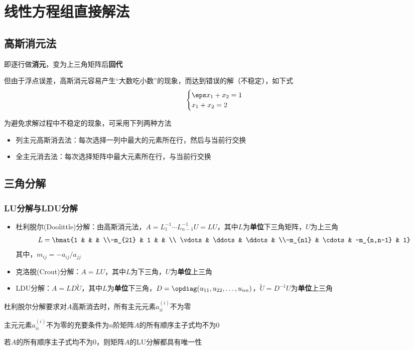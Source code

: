 
\section{线性方程组直接解法}
\subsection{高斯消元法}
即逐行做\textbf{消元}，变为上三角矩阵后\textbf{回代}

但由于浮点误差，高斯消元容易产生``大数吃小数''的现象，而达到错误的解（不稳定），如下式
\[\begin{cases}
    \eps x_1+x_2=1\\
    x_1+x_2=2
\end{cases}\]

为避免求解过程中不稳定的现象，可采用下列两种方法
\begin{itemize}
    \item 列主元高斯消去法：每次选择一列中最大的元素所在行，然后与当前行交换
    \item 全主元消去法：每次选择矩阵中最大元素所在行，与当前行交换
\end{itemize}

\subsection{三角分解}
\subsubsection{LU分解与LDU分解}
\begin{itemize}
\item 杜利脱尔(Doolittle)分解：由高斯消元法，$A=L_1^{-1}\cdots L_{n-1}^{-1}U=LU$，其中$L$为\textbf{单位}下三角矩阵，$U$为上三角
\[L=\bmat{1 & & & \\-m_{21} & 1 & & \\ \vdots & \ddots & \ddots & \\-m_{n1} & \cdots & -m_{n,n-1} & 1}\]
其中，$m_{ij}=-a_{ij}/a_{jj}$
\item 克洛脱(Crout)分解：$A=LU$，其中$L$为下三角，$U$为\textbf{单位}上三角
\item LDU分解：$A=LD\tilde{U}$，其中$L$为\textbf{单位}下三角，$D=\opdiag(u_{11},u_{22},\ldots,u_{nn})$，$\tilde{U}=D^{-1}U$为\textbf{单位}上三角
\end{itemize}

杜利脱尔分解要求对$A$高斯消去时，所有主元元素$a_{ii}^{(i)}$不为零
\begin{theorem}
    主元元素$a_{ii}^{(i)}$不为零的充要条件为$n$阶矩阵$A$的所有顺序主子式均不为$0$
\end{theorem}
\begin{theorem}
    若$A$的所有顺序主子式均不为$0$，则矩阵$A$的LU分解都具有唯一性
\end{theorem}

